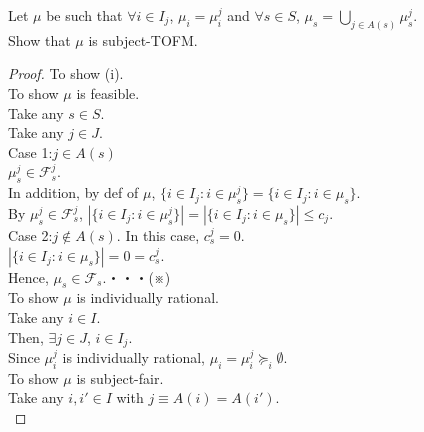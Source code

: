 \documentclass[a4j,10pt]{jsarticle}
\theoremstyle{definition}
\theoremstyle{remark}
\theoremstyle{plain}
\begin{document}
\begin{tcolorbox}[enhanced,breakable=true]
  Let $\mu$ be such that $\forall i \in I_j$, $\mu_i=\mu^j_i$ and $\forall s \in S$, $\mu_s = \bigcup\limits_{j \in A(s)} \mu^j_s$.\\
  Show that $\mu$ is subject-TOFM.
  \begin{proof}
    To show (i).\\
    To show $\mu$ is feasible.\\
    Take any $s \in S$.\\
    Take any $j \in J$.\\
    Case 1:$j \in A(s)$\\
    $\mu^j_s \in \mathcal{F}^j_s$.\\
    In addition, by def of $\mu$, $\{i \in I_j : i \in \mu^j_s\} = \{ i \in I_j : i\in \mu_s \}$.\\
    By $\mu^j_s \in \mathcal{F}^j_s$, $|\{i \in I_j : i \in \mu^j_s\}| = |\{ i \in I_j : i\in \mu_s \}| \leq c_j$.\\
    Case 2:$j \notin A(s)$.  In this case, $c^j_s=0$.\\
    $|\{i \in I_j : i \in \mu_s\}|= 0 = c^j_s$.\\
    Hence, $\mu_s \in \mathcal{F}_s$.・・・(※)\\
    To show $\mu$ is individually rational.\\
    Take any $i \in I$.\\
    Then, $\exists j \in J$, $i \in I_j$.\\
    Since $\mu^j_i$ is individually rational, $\mu_i = \mu^j_i \succeq_i \emptyset$.\\
    To show $\mu$ is subject-fair.\\
    Take any $i,i' \in I$ with $j \equiv  A(i) = A(i')$.\\

\end{proof}
\end{tcolorbox}
\end{document}
